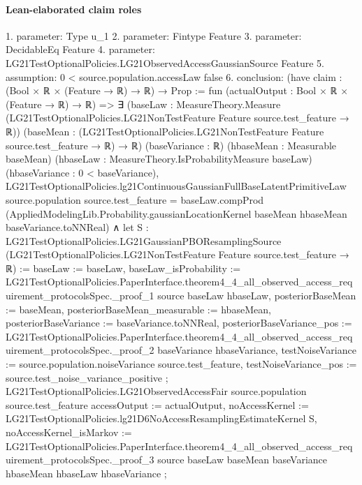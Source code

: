 \documentclass[10pt]{article}
\begin{document}
\paragraph{Lean-elaborated claim roles}\begin{ReviewVerbatim}
1. parameter: Type u_1
2. parameter: Fintype Feature
3. parameter: DecidableEq Feature
4. parameter: LG21TestOptionalPolicies.LG21ObservedAccessGaussianSource Feature
5. assumption: 0 < source.population.accessLaw {false}
6. conclusion: (have claim : (Bool × ℝ × (Feature → ℝ) → ℝ) → Prop := fun (actualOutput : Bool × ℝ × (Feature → ℝ) → ℝ) =>
    ∃ (baseLaw : MeasureTheory.Measure (LG21TestOptionalPolicies.LG21NonTestFeature Feature source.test_feature → ℝ))
      (baseMean : (LG21TestOptionalPolicies.LG21NonTestFeature Feature source.test_feature → ℝ) → ℝ) (baseVariance : ℝ)
      (hbaseMean : Measurable baseMean) (hbaseLaw : MeasureTheory.IsProbabilityMeasure baseLaw) (hbaseVariance :
      0 < baseVariance),
      LG21TestOptionalPolicies.lg21ContinuousGaussianFullBaseLatentPrimitiveLaw source.population source.test_feature =
          baseLaw.compProd
            (AppliedModelingLib.Probability.gaussianLocationKernel baseMean hbaseMean baseVariance.toNNReal) ∧
        let S :
          LG21TestOptionalPolicies.LG21GaussianPBOResamplingSource
            (LG21TestOptionalPolicies.LG21NonTestFeature Feature source.test_feature → ℝ) :=
          { baseLaw := baseLaw,
            baseLaw_isProbability :=
              LG21TestOptionalPolicies.PaperInterface.theorem4_4_all_observed_access_requirement_protocolsSpec._proof_1
                source baseLaw hbaseLaw,
            posteriorBaseMean := baseMean, posteriorBaseMean_measurable := hbaseMean,
            posteriorBaseVariance := baseVariance.toNNReal,
            posteriorBaseVariance_pos :=
              LG21TestOptionalPolicies.PaperInterface.theorem4_4_all_observed_access_requirement_protocolsSpec._proof_2
                baseVariance hbaseVariance,
            testNoiseVariance := source.population.noiseVariance source.test_feature,
            testNoiseVariance_pos := source.test_noise_variance_positive };
        LG21TestOptionalPolicies.LG21ObservedAccessFair source.population source.test_feature
          { accessOutput := actualOutput,
            noAccessKernel := LG21TestOptionalPolicies.lg21D6NoAccessResamplingEstimateKernel S,
            noAccessKernel_isMarkov :=
              LG21TestOptionalPolicies.PaperInterface.theorem4_4_all_observed_access_requirement_protocolsSpec._proof_3
                source baseLaw baseMean baseVariance hbaseMean hbaseLaw hbaseVariance };

\end{ReviewVerbatim}
\end{document}
